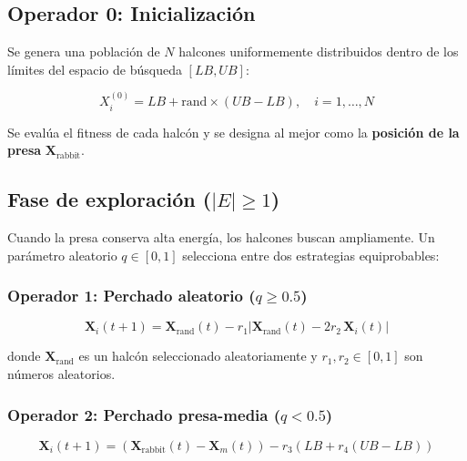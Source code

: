 \documentclass[12pt,letterpaper]{article}
\begin{document}
\subsection{Operador 0: Inicialización}

Se genera una población de $N$ halcones uniformemente distribuidos dentro de los límites del espacio de búsqueda $[LB, UB]$:

\begin{formulabox}
\begin{equation}
X_i^{(0)} = LB + \text{rand} \times (UB - LB), \quad i = 1, \ldots, N
\label{eq:init}
\end{equation}
\end{formulabox}

Se evalúa el fitness de cada halcón y se designa al mejor como la \textbf{posición de la presa} $\mathbf{X}_{\text{rabbit}}$.

\subsection{Fase de exploración (\texorpdfstring{$|E| \geq 1$}{|E|>=1})}

Cuando la presa conserva alta energía, los halcones buscan ampliamente. Un parámetro aleatorio $q \in [0,1]$ selecciona entre dos estrategias equiprobables:

\subsubsection{Operador 1: Perchado aleatorio (\texorpdfstring{$q \geq 0.5$}{q>=0.5})}

\begin{formulabox}
\begin{equation}
\mathbf{X}_i(t+1) = \mathbf{X}_{\text{rand}}(t) - r_1 \left| \mathbf{X}_{\text{rand}}(t) - 2r_2 \, \mathbf{X}_i(t) \right|
\label{eq:explor1}
\end{equation}
\end{formulabox}

donde $\mathbf{X}_{\text{rand}}$ es un halcón seleccionado aleatoriamente y $r_1, r_2 \in [0,1]$ son números aleatorios.

\subsubsection{Operador 2: Perchado presa-media (\texorpdfstring{$q < 0.5$}{q<0.5})}

\begin{formulabox}
\begin{equation}
\mathbf{X}_i(t+1) = \left(\mathbf{X}_{\text{rabbit}}(t) - \mathbf{X}_m(t)\right) - r_3\left(LB + r_4(UB - LB)\right)
\label{eq:explor2}
\end{equation}
\end{formulabox}
\end{document}
